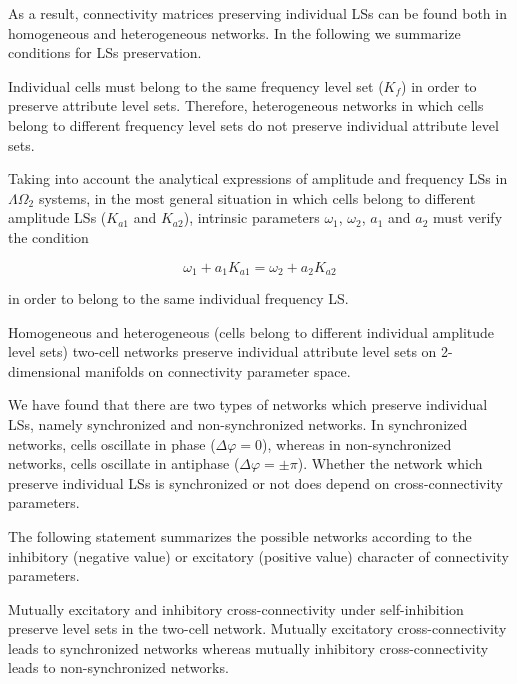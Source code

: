 As a result, connectivity matrices preserving individual LSs can be found both in homogeneous and heterogeneous networks. In the following we summarize conditions for LSs preservation.

\begin{Statement} 
Individual cells must belong to the same frequency level set ($K_{f}$) in order to preserve attribute level sets. Therefore, heterogeneous networks in which cells belong to different frequency level sets do not preserve individual attribute level sets.
\end{Statement}

Taking into account the analytical expressions of amplitude and frequency LSs in $\Lambda \Omega_{2}$ systems, in the most general situation in which cells belong to different amplitude LSs ($K_{a1}$ and $K_{a2}$), intrinsic parameters $\omega_{1}$, $\omega_{2}$, $a_{1}$ and $a_{2}$ must verify the condition

\begin{equation}
    \omega_{1}+a_{1}K_{a1} = \omega_{2}+ a_{2}K_{a2}
    \label{es125}
\end{equation}

in order to belong to the same individual frequency LS.

\begin{Statement} 
Homogeneous and heterogeneous (cells belong to different individual amplitude level sets) two-cell networks preserve individual attribute level sets on 2-dimensional manifolds on connectivity parameter space. 
\end{Statement} 

We have found that there are two types of networks which preserve individual LSs, namely synchronized and non-synchronized networks. In synchronized networks, cells oscillate in phase ($\Delta \varphi = 0$), whereas in non-synchronized networks, cells oscillate in antiphase ($\Delta \varphi = \pm \pi$). Whether the network which preserve individual LSs is synchronized or not does depend on cross-connectivity parameters.

The following statement summarizes the possible networks according to the inhibitory (negative value) or excitatory (positive value) character of connectivity parameters. 

\begin{Statement} 
Mutually excitatory and inhibitory cross-connectivity under self-inhibition preserve level sets in the two-cell network. Mutually excitatory cross-connectivity leads to synchronized networks whereas mutually inhibitory cross-connectivity leads to non-synchronized networks.
\end{Statement} 

